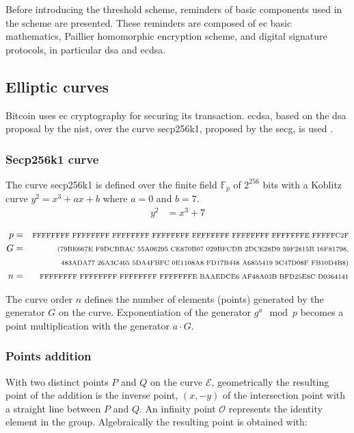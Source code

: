 Before introducing the threshold scheme, reminders of basic components used in
the scheme are presented. These reminders are composed of \gls{ec} basic
mathematics, Paillier homomorphic encryption scheme, and digital signature
protocols, in particular \gls{dsa} and \gls{ecdsa}.

\subsection{Elliptic curves}

Bitcoin uses \gls{ec} cryptography for securing its transaction. \gls{ecdsa},
based on the \gls{dsa} proposal by the \gls{nist}, over the curve secp256k1,
proposed by the \gls{secg}, is used \cite{sec2}.

\subsubsection{Secp256k1 curve}

The curve secp256k1 is defined over the finite field $\mathbb{F}_p$ of $2^{256}$
bits with a Koblitz curve $y^2 = x^3 + ax + b$ where $a = 0$ and $b = 7$.
\begin{equation*}
\begin{split}
  y^2 &= x^3 + 7\\
\end{split}
\end{equation*}
\begin{equation*}
\begin{split}
  p &= &\text{\scriptsize FFFFFFFF FFFFFFFF FFFFFFFF FFFFFFFF FFFFFFFF FFFFFFFF FFFFFFFE FFFFFC2F}\\
  G &= &\text{\scriptsize (79BE667E F9DCBBAC 55A06295 CE870B07 029BFCDB 2DCE28D9 59F2815B 16F81798,}\\
    &  &\text{\scriptsize  483ADA77 26A3C465 5DA4FBFC 0E1108A8 FD17B448 A6855419 9C47D08F FB10D4B8)}\\
  n &= &\text{\scriptsize FFFFFFFF FFFFFFFF FFFFFFFF FFFFFFFE BAAEDCE6 AF48A03B BFD25E8C D0364141}
\end{split}
\end{equation*}

The curve order $n$ defines the number of elements (points) generated by the
generator $G$ on the curve. Exponentiation of the generator $g^a \mod p$ becomes
a point multiplication with the generator $a \cdot G$.

\subsubsection{Points addition}
With two distinct points $P$ and $Q$ on the curve $\mathcal{E}$, geometrically
the resulting point of the addition is the inverse point, $(x, -y)$ of the
intersection point with a straight line between $P$ and $Q$. An infinity point
$\mathcal{O}$ represents the identity element in the group. Algebraically the
resulting point is obtained with:

